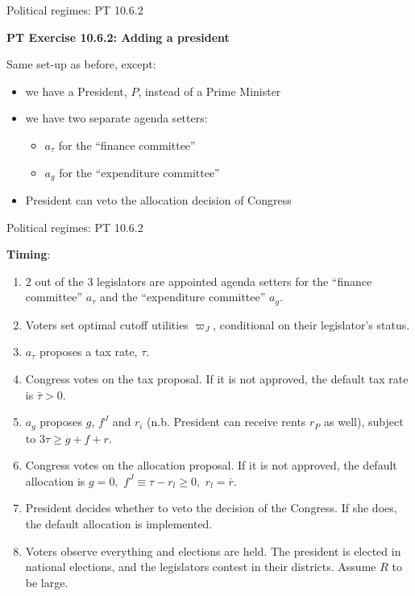 \documentclass[11pt,aspectratio=169]{beamer}
\begin{document}
\begin{frame}{Political regimes: PT 10.6.2}

\textbf{PT Exercise 10.6.2: Adding a president}


Same set-up as before, except:

\begin{itemize}
\item we have a President, $P$, instead of a Prime Minister
\pause
\item we have two separate agenda setters: 
\begin{itemize}
\item $a_\tau$ for the ``finance committee''  
\item $a_g$ for the ``expenditure committee''
\end{itemize}
\pause
\item President can veto the allocation decision of Congress 
\end{itemize}

\end{frame}

\begin{frame}{Political regimes: PT 10.6.2}

\footnotesize
\textbf{Timing}:

\begin{enumerate}
\item 2 out of the 3 legislators are appointed agenda setters for the ``finance committee'' $a_\tau$ and the ``expenditure committee'' $a_g$.
\item Voters set optimal cutoff utilities $\varpi_J$, conditional on their legislator's status.
\item $a_\tau$ proposes a tax rate, $\tau$.
\item Congress votes on the tax proposal. If it is not approved, the default tax rate is $\bar{\tau} > 0$.
\item $a_g$ proposes $g$, $f^J$ and $r_i$ (n.b. President can receive rents $r_P$ as well), subject to $3\tau \geq g + f + r$.
\item Congress votes on the allocation proposal. If it is not approved, the default allocation is $g=0, \, \, f^J \equiv \tau - r_l \geq 0, \, \, r_l = \bar{r}$.
\item President decides whether to veto the decision of the Congress. If she does, the default allocation is implemented.
\item Voters observe everything and elections are held. The president is elected in national elections, and the legislators contest in their districts. Assume $R$ to be large.
\end{enumerate}

\end{frame}
\end{document}
